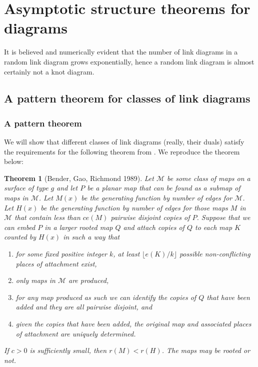 \documentclass[amsmath,longbibliography,secnumarabic,floatfix,amssymb,nofootinbib,nobibnotes,letterpaper,11pt,notitlepage,tightenlines]{revtex4-1}
\newtheorem{theorem}{Theorem}
\begin{document}
\section{Asymptotic structure theorems for diagrams}
\label{sec:structure}

It is believed and numerically evident \cite{PZJasympconj2004} that the number of link diagrams in a
random link diagram grows exponentially, hence a random link diagram is almost certainly not a knot
diagram.

\subsection{A pattern theorem for classes of link diagrams}
\label{sec:patternthm}

\newcommand{\MapClass}{\mathscr{M}}

\subsubsection{A pattern theorem}
\label{sec:weakpatternthm}

We will show that different classes of link diagrams (really, their duals) satisfy the requirements
for the following theorem from \cite{Bender1992104}. We reproduce the theorem below:

\begin{theorem}[Bender, Gao, Richmond 1989] Let $\MapClass$ be some class of maps on a surface of
  type $g$ and let $P$ be a planar map that can be found as a submap of maps in $\MapClass$. Let
  $M(x)$ be the generating function by number of edges for $\MapClass$. Let $H(x)$ be the generating
  function by number of edges for those maps $M$ in $\MapClass$ that contain less than $ce(M)$
  pairwise disjoint copies of $P$. Suppose that we can embed $P$ in a larger rooted map $Q$ and
  attach copies of $Q$ to each map $K$ counted by $H(x)$ in such a way that
  \begin{enumerate}
  \item for some fixed positive integer $k$, at least $\lfloor e(K)/k \rfloor$ possible
    non-conflicting places of attachment exist,
  \item only maps in $\MapClass$ are produced,
  \item for any map produced as such we can identify the copies of $Q$ that have been added and they
    are all pairwise disjoint, and
  \item given the copies that have been added, the original map and associated places of attachment
    are uniquely determined.
  \end{enumerate} If $c > 0$ is sufficiently small, then $r(M) < r(H)$. The maps may be rooted or
  not.
  \label{thr:weakpattern}
\end{theorem}
\end{document}
